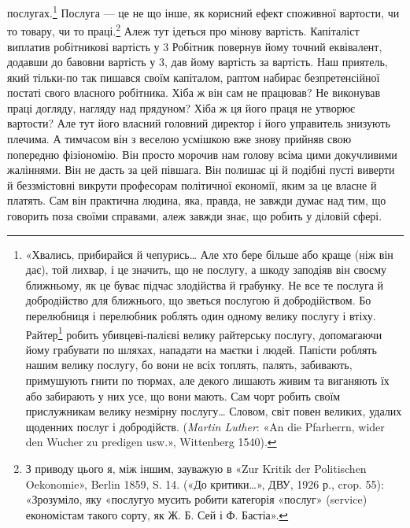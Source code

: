 послугах.\footnote{
«Хвались, прибирайся й чепурись\dots{} Але хто бере
більше або краще (ніж він дає), той лихвар, і це значить, що не послугу,
а шкоду заподіяв він своєму ближньому, як це буває підчас злодійства й грабунку.
Не все те послуга й добродійство для ближнього, що зветься послугою й
добродійством. Бо перелюбниця і перелюбник роблять один одному велику
послугу і втіху. Райтер\footnote*{
-військовий, кінник. \emph{Ред.}
}
робить убивцеві-палієві велику райтерську
послугу, допомагаючи йому грабувати по шляхах, нападати на маєтки і
людей. Папісти роблять нашим велику послугу, бо вони не всіх топлять,
палять, забивають, примушують гнити по тюрмах, але декого лишають
живим та виганяють їх або забирають у них усе, що вони мають. Сам чорт
робить своїм прислужникам велику незмірну послугу\dots{} Словом, світ
повен великих, удалих щоденних послуг і добродійств. (\emph{Martin Luther}:
«An die Pfarherrn, wider den Wucher zu predigen usw.», Wittenberg 1540).
} Послуга — це не що інше, як корисний ефект споживної
вартости, чи то товару, чи то праці.\footnote{
З приводу цього я, між іншим, зауважую в «Zur Kritik der Politischen
Oekonomie», Berlin 1859, S. 14. («До критики\dots{}», ДВУ, 1926 р.,
crop. 55): «Зрозуміло, яку «послугуо мусить робити категорія «послуг»
(service) економістам такого сорту, як Ж. Б. Сей і Ф. Бастіа».
} Алеж тут ідеться
про мінову вартість. Капіталіст виплатив робітникові вартість
у 3 Робітник повернув йому точний еквівалент, додавши
до бавовни вартість у 3, дав йому вартість за вартість.
Наш приятель, який тільки-по так пишався своїм капіталом,
раптом набирає безпретенсійної постаті свого власного робітника.
Хіба ж він сам не працював? Не виконував праці догляду, нагляду
над прядуном? Хіба ж ця його праця не утворює вартости?
Але тут його власний головний директор і його управитель знизують
плечима. А тимчасом він з веселою усмішкою вже знову прийняв
свою попередню фізіономію. Він просто морочив нам голову
всіма цими докучливими жаліннями. Він не дасть за цей півшага.
Він полишає ці й подібні пусті виверти й беззмістовні викрути
професорам політичної економії, яким за це власне й платять.
Сам він практична людина, яка, правда, не завжди думає над тим,
що говорить поза своїми справами, алеж завжди знає, що робить
у діловій сфері.

